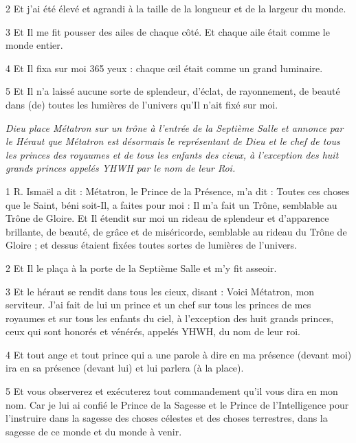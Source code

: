 \par 2 Et j'ai été élevé et agrandi à la taille de la longueur et de la largeur du monde.

\par 3 Et Il me fit pousser des ailes de chaque côté. Et chaque aile était comme le monde entier.

\par 4 Et Il fixa sur moi 365 yeux : chaque œil était comme un grand luminaire.

\par 5 Et Il n'a laissé aucune sorte de splendeur, d'éclat, de rayonnement, de beauté dans (de) toutes les lumières de l'univers qu'Il n'ait fixé sur moi.


\par \textit{Dieu place Métatron sur un trône à l'entrée de la Septième Salle et annonce par le Héraut que Métatron est désormais le représentant de Dieu et le chef de tous les princes des royaumes et de tous les enfants des cieux, à l'exception des huit grands princes appelés YHWH par le nom de leur Roi.}

\par 1 R. Ismaël a dit : Métatron, le Prince de la Présence, m'a dit : Toutes ces choses que le Saint, béni soit-Il, a faites pour moi : Il m'a fait un Trône, semblable au Trône de Gloire. Et Il étendit sur moi un rideau de splendeur et d'apparence brillante, de beauté, de grâce et de miséricorde, semblable au rideau du Trône de Gloire ; et dessus étaient fixées toutes sortes de lumières de l’univers.

\par 2 Et Il le plaça à la porte de la Septième Salle et m'y fit asseoir.

\par 3 Et le héraut se rendit dans tous les cieux, disant : Voici Métatron, mon serviteur. J'ai fait de lui un prince et un chef sur tous les princes de mes royaumes et sur tous les enfants du ciel, à l'exception des huit grands princes, ceux qui sont honorés et vénérés, appelés YHWH, du nom de leur roi.

\par 4 Et tout ange et tout prince qui a une parole à dire en ma présence (devant moi) ira en sa présence (devant lui) et lui parlera (à la place).

\par 5 Et vous observerez et exécuterez tout commandement qu'il vous dira en mon nom. Car je lui ai confié le Prince de la Sagesse et le Prince de l'Intelligence pour l'instruire dans la sagesse des choses célestes et des choses terrestres, dans la sagesse de ce monde et du monde à venir.

